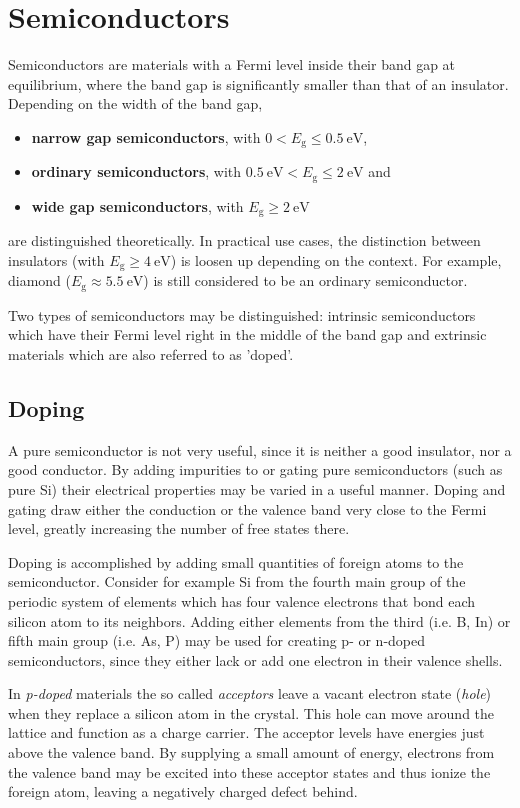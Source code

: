 \section{Semiconductors}
Semiconductors are materials with a Fermi level inside their band gap at equilibrium, where the band gap is significantly smaller than that of an insulator.
Depending on the width of the band gap,
\begin{itemize}
	\item \textbf{narrow gap semiconductors}, with $0<E_\text{g}\leq\SI{0.5}{\eV}$,
	\item \textbf{ordinary semiconductors}, with $\SI{0.5}{\eV}<E_\text{g}\leq\SI{2}{\eV}$ and
	\item \textbf{wide gap semiconductors}, with $E_\text{g}\geq\SI{2}{\eV}$
\end{itemize}
are distinguished theoretically.
In practical use cases, the distinction between insulators (with $E_\text{g}\geq\SI{4}{\eV}$) is loosen up depending on the context.
For example, diamond ($E_\text{g}\approx\SI{5.5}{\eV}$) is still considered to be an ordinary semiconductor.

Two types of semiconductors may be distinguished: intrinsic semiconductors which have their Fermi level right in the middle of the band gap and extrinsic materials which are also referred to as 'doped'.

\subsection{Doping}
A pure semiconductor is not very useful, since it is neither a good insulator, nor a good conductor.
By adding impurities to or gating pure semiconductors (such as pure Si) their electrical properties may be varied in a useful manner.
Doping and gating draw either the conduction or the valence band very close to the Fermi level, greatly increasing the number of free states there.

Doping is accomplished by adding small quantities of foreign atoms to the semiconductor.
Consider for example Si from the fourth main group of the periodic system of elements which has four valence electrons that bond each silicon atom to its neighbors.
Adding either elements from the third (i.e. B, In) or fifth main group (i.e. As, P) may be used for creating p- or n-doped semiconductors, since they either lack or add one electron in their valence shells.

In \textit{p-doped} materials the so called \textit{acceptors} leave a vacant electron state (\textit{hole}) when they replace a silicon atom in the crystal.
This hole can move around the lattice and function as a charge carrier.
The acceptor levels have energies just above the valence band.
By supplying a small amount of energy, electrons from the valence band may be excited into these acceptor states and thus ionize the foreign atom, leaving a negatively charged defect behind.

